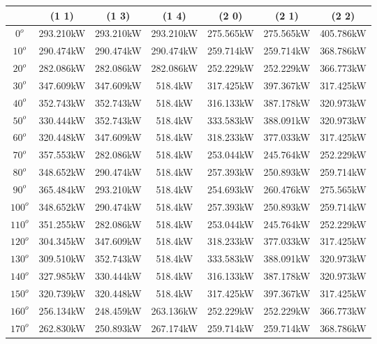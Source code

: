         \begin{table}[H]
        	\centering
        	\begin{tabular}{|c|c|c|c|c|c|c|} \hline
        			& (1 1)		& (1 3)		& (1 4)		& (2 0)		& (2 1)		& (2 2)		\\ \hline
		$0^o$	& 293.210kW	& 293.210kW	& 293.210kW	& 275.565kW	& 275.565kW	& 405.786kW	\\ \hline
		$10^o$	& 290.474kW	& 290.474kW	& 290.474kW	& 259.714kW	& 259.714kW	& 368.786kW	\\ \hline
		$20^o$	& 282.086kW	& 282.086kW	& 282.086kW	& 252.229kW	& 252.229kW	& 366.773kW	\\ \hline
		$30^o$	& 347.609kW	& 347.609kW	& 518.4kW	& 317.425kW	& 397.367kW	& 317.425kW	\\ \hline
		$40^o$	& 352.743kW	& 352.743kW	& 518.4kW	& 316.133kW	& 387.178kW	& 320.973kW	\\ \hline
		$50^o$	& 330.444kW	& 352.743kW	& 518.4kW	& 333.583kW	& 388.091kW	& 320.973kW	\\ \hline
		$60^o$	& 320.448kW	& 347.609kW	& 518.4kW	& 318.233kW	& 377.033kW	& 317.425kW	\\ \hline
		$70^o$	& 357.553kW	& 282.086kW	& 518.4kW	& 253.044kW	& 245.764kW	& 252.229kW	\\ \hline
		$80^o$	& 348.652kW	& 290.474kW	& 518.4kW	& 257.393kW	& 250.893kW	& 259.714kW	\\ \hline
		$90^o$	& 365.484kW	& 293.210kW	& 518.4kW	& 254.693kW	& 260.476kW	& 275.565kW	\\ \hline
		$100^o$	& 348.652kW	& 290.474kW	& 518.4kW	& 257.393kW	& 250.893kW	& 259.714kW	\\ \hline
		$110^o$	& 351.255kW	& 282.086kW	& 518.4kW	& 253.044kW	& 245.764kW	& 252.229kW	\\ \hline
		$120^o$	& 304.345kW	& 347.609kW	& 518.4kW	& 318.233kW	& 377.033kW	& 317.425kW	\\ \hline
		$130^o$	& 309.510kW	& 352.743kW	& 518.4kW	& 333.583kW	& 388.091kW	& 320.973kW	\\ \hline
		$140^o$	& 327.985kW	& 330.444kW	& 518.4kW	& 316.133kW	& 387.178kW	& 320.973kW	\\ \hline
		$150^o$	& 320.739kW	& 320.448kW	& 518.4kW	& 317.425kW	& 397.367kW	& 317.425kW	\\ \hline
		$160^o$	& 256.134kW	& 248.459kW	& 263.136kW	& 252.229kW	& 252.229kW	& 366.773kW	\\ \hline
		$170^o$	& 262.830kW	& 250.893kW	& 267.174kW	& 259.714kW	& 259.714kW	& 368.786kW	\\ \hline

\end{tabular}
\end{table}
